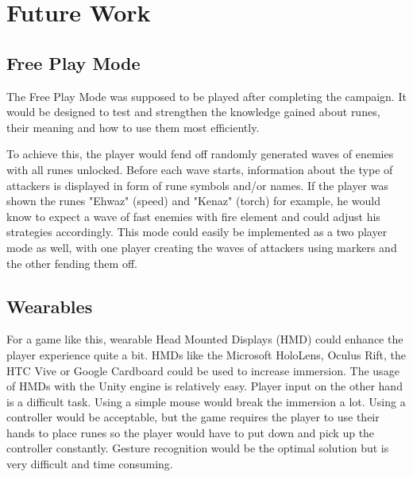 \section{Future Work}

\subsection{Free Play Mode}

The Free Play Mode was supposed to be played after completing the campaign. It would be designed to test and strengthen the knowledge gained about runes, their meaning and how to use them most efficiently.

To achieve this, the player would fend off randomly generated waves of enemies with all runes unlocked. Before each wave starts, information about the type of attackers is displayed in form of rune symbols and/or names. If the player was shown the runes "Ehwaz" (speed) and "Kenaz" (torch) for example, he would know to expect a wave of fast enemies with fire element and could adjust his strategies accordingly.
This mode could easily be implemented as a two player mode as well, with one player creating the waves of attackers using markers and the other fending them off.

\subsection{Wearables}

For a game like this, wearable Head Mounted Displays (HMD) could enhance the player experience quite a bit. HMDs like the Microsoft HoloLens, Oculus Rift, the HTC Vive or Google Cardboard could be used to increase immersion.
The usage of HMDs with the Unity engine is relatively easy. Player input on the other hand is a difficult task.
Using a simple mouse would break the immersion a lot. Using a controller would be acceptable, but the game requires the player to use their hands to place runes so the player would have to put down and pick up the controller constantly. Gesture recognition would be the optimal solution but is very difficult and time consuming. 
